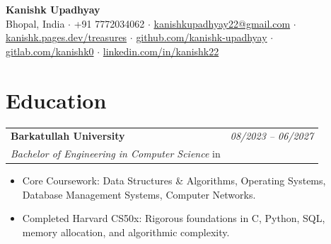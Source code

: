 \documentclass[10pt,letterpaper]{article}
\begin{document}
\begin{center}
  {\LARGE \textbf{Kanishk Upadhyay}} \\[2pt]
  {\small Bhopal, India $\cdot$ +91 7772034062 $\cdot$ \href{mailto:kanishkupadhyay22@gmail.com}{kanishkupadhyay22@gmail.com} $\cdot$ \href{https://kanishk.pages.dev/treasures}{kanishk.pages.dev/treasures} $\cdot$ \href{https://github.com/kanishk-upadhyay}{github.com/kanishk-upadhyay} $\cdot$ \href{https://gitlab.com/kanishk0}{gitlab.com/kanishk0} $\cdot$ \href{https://linkedin.com/in/kanishk22}{linkedin.com/in/kanishk22}}
\end{center}
\vspace{-4pt}

\section{Education}
\noindent\begin{tabular*}{\textwidth}{@{\extracolsep{\fill}}lr}
  \textbf{Barkatullah University} & \textit{08/2023 -- 06/2027} \\
  \textit{Bachelor of Engineering in Computer Science} in  & \textit{} \\
\end{tabular*}\vspace{-2pt}
\begin{itemize}
  \item Core Coursework: Data Structures \& Algorithms, Operating Systems, Database Management Systems, Computer Networks.
  \item Completed Harvard CS50x: Rigorous foundations in C, Python, SQL, memory allocation, and algorithmic complexity.
\end{itemize}\vspace{2pt}
\end{document}
